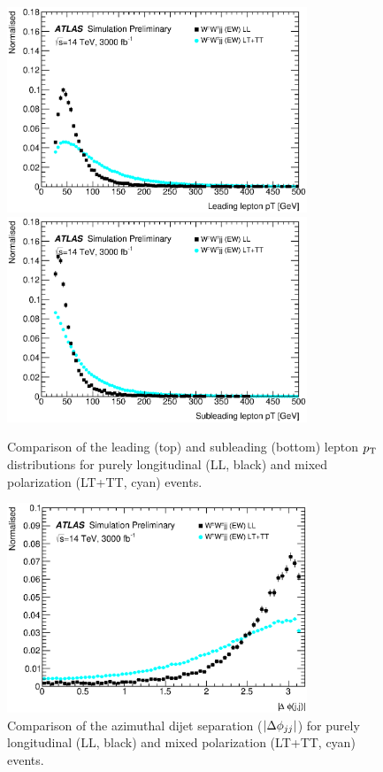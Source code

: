 \begin{figure}[htp]
  \centering
  \includegraphics[width=0.8\textwidth]{figs/ssww_upgrade/polarization/lepton0_pt_pass9}\\
  \includegraphics[width=0.8\textwidth]{figs/ssww_upgrade/polarization/lepton1_pt_pass9}
  \caption{Comparison of the leading (top) and subleading (bottom) lepton $p_{\mathrm{T}}$ distributions for purely longitudinal (LL, black) and mixed polarization (LT+TT, cyan) \ssww events.}
  \label{fig:polarization_leppt}
\end{figure}

\begin{figure}[htp]
  \centering
  \includegraphics[width=0.8\textwidth]{figs/ssww_upgrade/polarization/dijet_absdphijj_pass9}
  \caption{Comparison of the azimuthal dijet separation ($|\Delta\phi_{jj}|$) for purely longitudinal (LL, black) and mixed polarization (LT+TT, cyan) \ssww events.}
  \label{fig:polarization_dphijj}
\end{figure}

